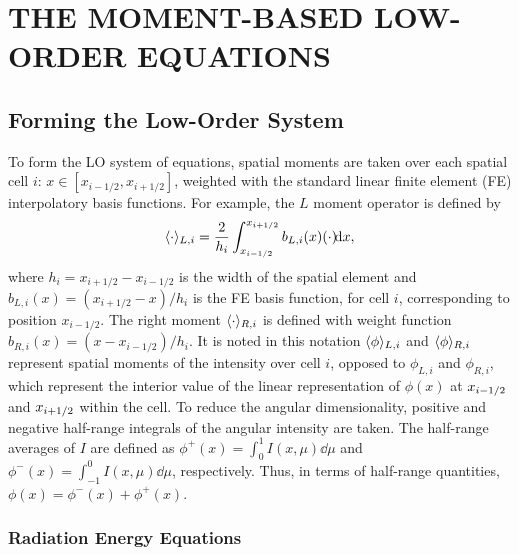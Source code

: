 
\chapter{\uppercase{The Moment-Based Low-Order Equations}}

\section{Forming the Low-Order System}

To form the LO system of equations, spatial moments are taken over each spatial cell $i$:
$x\in[x_{i-1/2},x_{i+1/2}]$, weighted with the standard linear finite element (FE)
interpolatory basis functions.  For example, the $L$  moment operator is defined by
\begin{equation}\label{x_mom}
\langle \cdot \rangle_{L,i} = \frac{2}{h_i} \int_{x_{i-1/2}}^{{x_{i+1/2}}} b_{L,i}(x) (\cdot) \!\mathrm{d} x,
\end{equation}
where $h_i=x_{i+1/2}-x_{i-1/2}$ is the width of the spatial element and
$b_{L,i}(x)=(x_{i+1/2}-x)/h_i$ is the FE basis function, for cell $i$, corresponding to position
$x_{i-1/2}$.  The right moment $\langle \cdot \rangle_{R,i}$ is defined with weight function $b_{R,i}(x)=(x -
x_{i-1/2})/h_i$. It is noted in this notation $\langle \phi \rangle_{L,i}$ and
$\langle \phi \rangle_{R,i}$ represent spatial moments of the intensity over cell $i$, opposed
to $\phi_{L,i}$ and $\phi_{R,i}$, which represent the interior value of the linear
representation of $\phi(x)$ at $x_{{i-1/2}}$ and $x_{{i+1/2}}$ within the cell. To reduce the angular dimensionality, positive and
negative half-range integrals of the angular intensity are taken.  The half-range
averages of $I$ are defined as $ \phi^+(x) = \int_0^{1} I(x,\mu) \dd \mu$ and $ \phi^-(x) = \int_{-1}^{0} I(x,\mu) \dd
\mu$, respectively.  Thus, in terms of half-range quantities, $\phi(x) = \phi^-(x) +
\phi ^+(x)$.  

\subsection{Radiation Energy Equations}

